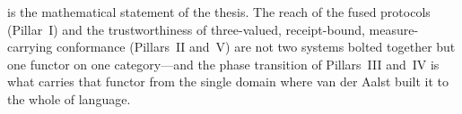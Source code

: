  is the mathematical statement of the thesis. The reach of the
fused protocols (Pillar~I) and the trustworthiness of three-valued, receipt-bound,
measure-carrying conformance (Pillars~II and~V) are not two systems bolted together
but one functor on one category---and the phase transition of
Pillars~III and~IV is what carries that functor from the single domain where van der
Aalst built it to the whole of language.

